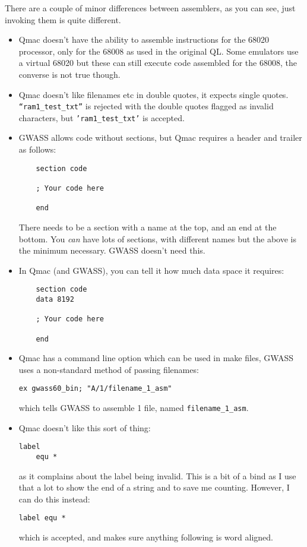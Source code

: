 There are a couple of minor differences between assemblers, as you
can see, just invoking them is quite different.
\begin{itemize}
\item Qmac doesn't have the ability to assemble instructions for the 68020
processor, only for the 68008 as used in the original QL. Some emulators
use a virtual 68020 but these can still execute code assembled for
the 68008, the converse is not true though.
\item Qmac doesn't like filenames etc in double quotes, it expects single
quotes. \texttt{``ram1\_test\_txt''} is rejected with the double
quotes flagged as invalid characters, but \texttt{'ram1\_test\_txt'}
is accepted.
\item GWASS allows code without sections, but Qmac requires a header and
trailer as follows: 
\begin{lstlisting}
    section code

    ; Your code here

    end
\end{lstlisting}

There needs to be a section with a name at the top, and an end at
the bottom. You \emph{can} have lots of sections, with different names
but the above is the minimum necessary. GWASS doesn't need this.
\item In Qmac (and GWASS), you can tell it how much data space it requires:
\begin{lstlisting}
    section code
    data 8192

    ; Your code here

    end
\end{lstlisting}
\item Qmac has a command line option which can be used in make files, GWASS
uses a non-standard method of passing filenames:
\begin{lstlisting}
ex gwass60_bin; "A/1/filename_1_asm"
\end{lstlisting}
 which tells GWASS to assemble 1 file, named \texttt{filename\_1\_asm}.
\item Qmac doesn't like this sort of thing:
\begin{lstlisting}
label 
    equ *
\end{lstlisting}
as it complains about the label being invalid. This is a bit of a
bind as I use that a lot to show the end of a string and to save me
counting. However, I can do this instead:
\begin{lstlisting}
label equ *
\end{lstlisting}
 which is accepted, and makes sure anything following is word aligned.
\end{itemize}

